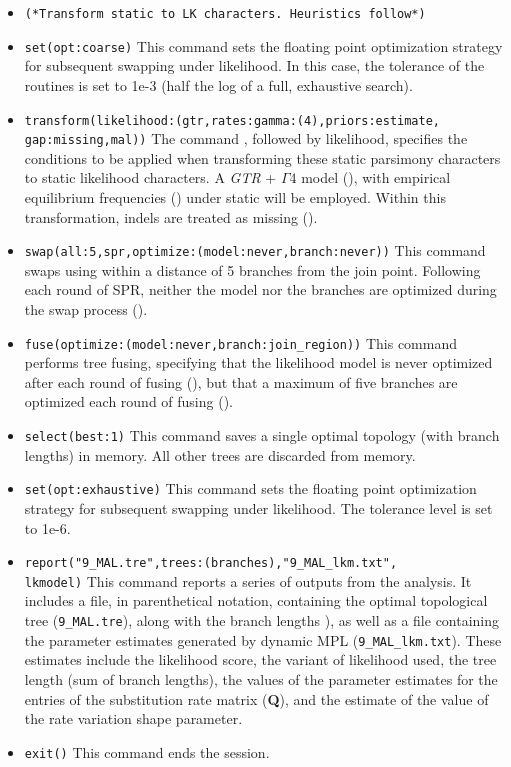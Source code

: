\begin{itemize}
\item \texttt{(*Transform static to LK characters. Heuristics
follow*)} 
\item \texttt{set(opt:coarse)} This command sets the
floating point optimization strategy for subsequent swapping under
likelihood. In this case, the tolerance of the routines is set to
1e-3 (half the log of a full, exhaustive search).  
\item \texttt{transform(likelihood:(gtr,rates:gamma:(4),priors:estimate,\\gap:missing,mal))}
The command , followed by \poyargument
{likelihood}, specifies the conditions to be applied when transforming
these static parsimony characters to static likelihood characters.
A \emph{GTR} + $\Gamma 4$ model (),
with empirical equilibrium frequencies ()
under static  will be employed.  Within this
transformation, indels are treated as missing ().
\item \texttt{swap(all:5,spr,optimize:(model:never,branch:never))}
This command swaps using  within a distance of 5
branches from the join point. Following each round of SPR, neither
the model nor the branches are optimized during the swap process
().  
\item \texttt{fuse(optimize:(model:never,branch:join\_region))} This
command performs tree fusing, specifying that the likelihood model
is never optimized after each round of fusing
(), but that a maximum of five
branches are optimized each round of fusing
().  
\item \texttt{select(best:1)} This command saves a single optimal
topology (with branch lengths) in memory. All other trees are
discarded from memory.  
\item \texttt{set(opt:exhaustive)} This command sets the floating 
point optimization strategy for subsequent swapping under likelihood. 
The tolerance level is set to 1e-6.  
\item \texttt{report("9\_MAL.tre",trees:(branches),"9\_MAL\_lkm.txt",\\
lkmodel)} This command reports a series of outputs from the analysis.
It includes a file, in parenthetical notation, containing the 
optimal topological tree (\texttt{9\_MAL.tre}), along with the
branch lengths ), as well as a file
containing the parameter estimates generated by dynamic MPL
(\texttt{9\_MAL\_lkm.txt}). These estimates include the likelihood
score, the variant of likelihood used, the tree length (sum of
branch lengths), the values of the parameter estimates for the
entries of the substitution rate matrix (\textbf{Q}), and the
estimate of the value of the rate variation shape parameter.  
\item \texttt{exit()} This command ends the \poy session.

\end{itemize}

